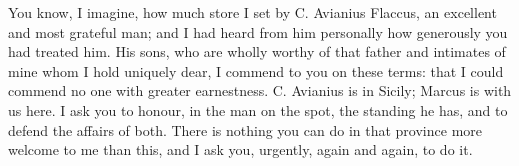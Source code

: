

You know, I imagine, how much store I set by C. Avianius Flaccus, an excellent and most grateful man; and I had heard from him personally how generously you had treated him. His sons, who are wholly worthy of that father and intimates of mine whom I hold uniquely dear, I commend to you on these terms: that I could commend no one with greater earnestness. C. Avianius is in Sicily; Marcus is with us here. I ask you to honour, in the man on the spot, the standing he has, and to defend the affairs of both. There is nothing you can do in that province more welcome to me than this, and I ask you, urgently, again and again, to do it.
